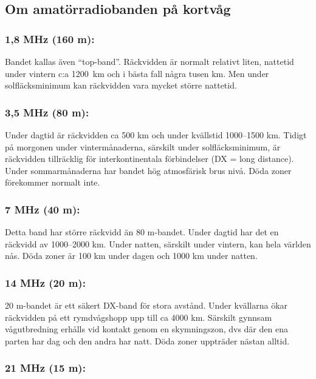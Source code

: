 \subsection{Om amatörradiobanden på kortvåg}

\subsubsection{1,8 MHz (160 m):}

Bandet kallas även ``top-band''. Räckvidden är normalt relativt liten,
nattetid under vintern c:a 1200~km och i bästa fall några tusen km.
Men under solfläcksminimum kan räckvidden vara mycket större nattetid.

\subsubsection{3,5 MHz (80 m):}

Under dagtid är räckvidden ca 500 km och under kvällstid 1000--1500
km. Tidigt på morgonen under vintermånaderna, särskilt under
solfläcksminimum, är räckvidden tillräcklig för interkontinentala
förbindelser (DX = long distance). Under sommarmånaderna har bandet
hög atmosfärisk brus nivå. Döda zoner förekommer normalt inte.

\subsubsection{7 MHz (40 m):}

Detta band har större räckvidd än 80 m-bandet. Under dagtid har det en
räckvidd av 1000--2000 km. Under natten, särskilt under vintern, kan
hela världen nås. Döda zoner är 100 km under dagen och 1000 km under
natten.

\subsubsection{14 MHz (20 m):}

20 m-bandet är ett säkert DX-band för stora avstånd. Under kvällarna
ökar räckvidden på ett rymdvågshopp upp till ca 4000 km.  Särskilt
gynnsam vågutbredning erhålls vid kontakt genom en skymningszon, dvs
där den ena parten har dag och den andra har natt. Döda zoner
uppträder nästan alltid.

\subsubsection{21 MHz (15 m):}

